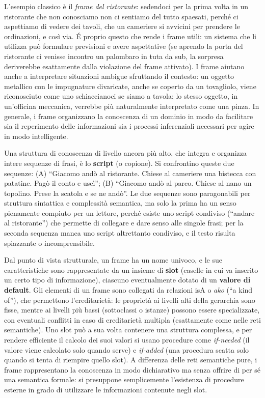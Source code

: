 \documentclass[11pt,a4paper]{report}
\begin{document}
L'esempio classico è il \emph{frame del ristorante}: sedendoci per la prima volta in un ristorante che non conosciamo non ci sentiamo del tutto spaesati, perché ci aspettiamo di vedere dei tavoli, che un cameriere si avvicini per prendere le ordinazioni, e così via. \'E proprio questo che rende i frame utili: un sistema che li utilizza può formulare previsioni e avere aspettative (se aprendo la porta del ristorante ci venisse incontro un palombaro in tuta da sub, la sorpresa deriverebbe esattamente dalla violazione del frame attivato). I frame aiutano anche a interpretare situazioni ambigue sfruttando il contesto: un oggetto metallico con le impugnature divaricate, anche se coperto da un tovagliolo, viene riconosciuto come uno schiaccianoci se siamo a tavola; lo stesso oggetto, in un'officina meccanica, verrebbe più naturalmente interpretato come una pinza. In generale, i frame organizzano la conoscenza di un dominio in modo da facilitare sia il reperimento delle informazioni sia i processi inferenziali necessari per agire in modo intelligente.

Una struttura di conoscenza di livello ancora più alto, che integra e organizza intere sequenze di frasi, è lo \textbf{script} (o copione). Si confrontino queste due sequenze: (A) ``Giacomo andò al ristorante. Chiese al cameriere una bistecca con patatine. Pagò il conto e uscì''; (B) ``Giacomo andò al parco. Chiese al nano un topolino. Prese la scatola e se ne andò''. Le due sequenze sono paragonabili per struttura sintattica e complessità semantica, ma solo la prima ha un senso pienamente compiuto per un lettore, perché esiste uno script condiviso (``andare al ristorante'') che permette di collegare e dare senso alle singole frasi; per la seconda sequenza manca uno script altrettanto condiviso, e il testo risulta spiazzante o incomprensibile.

Dal punto di vista strutturale, un frame ha un nome univoco, e le sue caratteristiche sono rappresentate da un insieme di \textbf{slot} (caselle in cui va inserito un certo tipo di informazione), ciascuno eventualmente dotato di un \textbf{valore di default}. Gli elementi di un frame sono collegati da relazioni isA o \emph{ako} (``a kind of''), che permettono l'ereditarietà: le proprietà ai livelli alti della gerarchia sono fisse, mentre ai livelli più bassi (sottoclassi o istanze) possono essere specializzate, con eventuali conflitti in caso di ereditarietà multipla (esattamente come nelle reti semantiche). Uno slot può a sua volta contenere una struttura complessa, e per rendere efficiente il calcolo dei suoi valori si usano procedure come \emph{if-needed} (il valore viene calcolato solo quando serve) e \emph{if-added} (una procedura scatta solo quando si tenta di riempire quello slot). A differenza delle reti semantiche pure, i frame rappresentano la conoscenza in modo dichiarativo ma senza offrire di per sé una semantica formale: si presuppone semplicemente l'esistenza di procedure esterne in grado di utilizzare le informazioni contenute negli slot.
\end{document}
